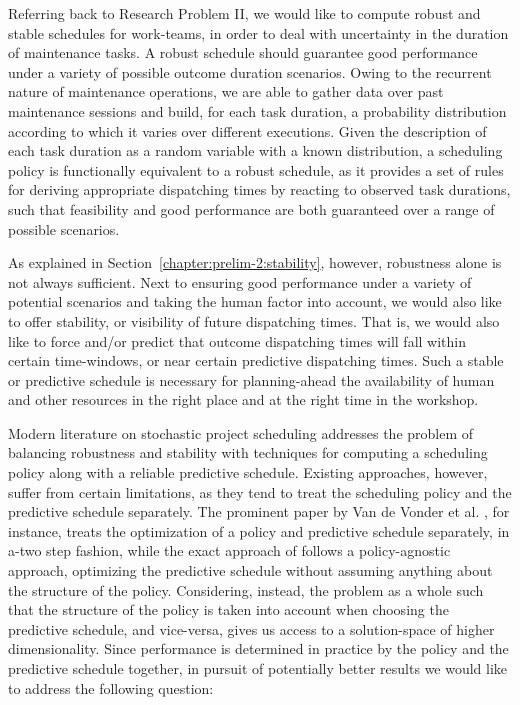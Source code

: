 	Referring back to Research Problem II, 
	we would like to compute robust and stable schedules for work-teams,
	in order to deal with uncertainty in the duration of maintenance tasks.
	A robust schedule should guarantee good performance under a variety of possible outcome duration scenarios.
	Owing to the recurrent nature of maintenance operations,
	we are able to gather data over past maintenance sessions and build, for each task duration, 
	a probability distribution according to which it varies over different executions.
	Given the description of each task duration as a random variable with a known distribution,
	a scheduling policy is functionally equivalent to a robust schedule,
	as it provides a set of rules for deriving appropriate dispatching times by reacting to observed task durations,
	such that feasibility and good performance are both guaranteed over a range of possible scenarios.

	As explained in Section~\ref{chapter:prelim-2:stability}, however, robustness alone is not always sufficient.
	Next to ensuring good performance under a variety of potential scenarios and taking the human factor into account, 
	we would also like to offer stability, or visibility of future dispatching times.
	That is, we would also like to force and/or predict that outcome dispatching times will fall within certain time-windows,
	or near certain predictive dispatching times. 
	Such a stable or predictive schedule is necessary for planning-ahead the availability of human and other resources
	in the right place and at the right time in the workshop.

	Modern literature on stochastic project scheduling addresses the problem of balancing robustness and stability
	with techniques for computing a scheduling policy along with a reliable predictive schedule.
	Existing approaches, however, suffer from certain limitations,
	as they tend to treat the scheduling policy and the predictive schedule separately.
	The prominent paper by Van de Vonder et al. \cite{van2008}, for instance, 
	treats the optimization of a policy and predictive schedule separately, in a-two step fashion,
	while the exact approach of \cite{lamas2015} follows a policy-agnostic approach, 
	optimizing the predictive schedule without assuming anything about the structure of the policy.
	Considering, instead, the problem as a whole such that the structure of the policy is taken into account when choosing the predictive schedule, and vice-versa,
	gives us access to a solution-space of higher dimensionality.
	Since performance is determined in practice by the policy and the predictive schedule together,
	in pursuit of potentially better results we would like to address the following question:
		
